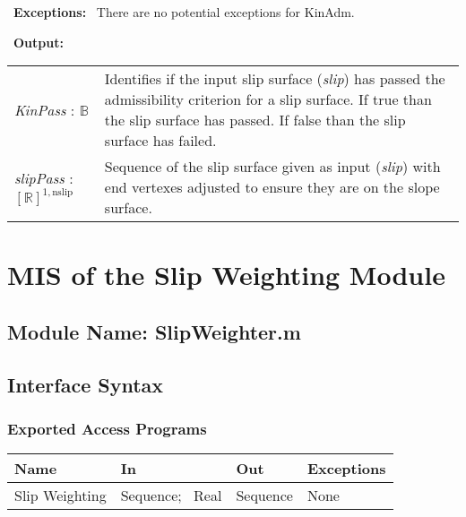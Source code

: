 \documentclass[12pt]{article}
\begin{document}
~\newline\noindent \textbf{Exceptions:} ~\newline\noindent There are
no potential exceptions for KinAdm.

~\newline\noindent \textbf{Output:}
\renewcommand{\arraystretch}{1.5}
\begin{longtable}{p{} p{}}
  \textit{KinPass} : $\mathbb{B}$ & Identifies if the input slip
  surface (\textit{slip}) has passed the admissibility criterion for a
  slip surface. If true than the slip surface has passed. If false
  than the slip surface has failed. \\

  \textit{slipPass} : $[\mathbb{R}]^{1,\text{nslip}}$ & Sequence of
  the slip surface given as input (\textit{slip}) with end vertexes
  adjusted to ensure they are on the slope surface.
\end{longtable}


\section{MIS of the Slip Weighting
  Module} \label{sec:WeightMod}

\subsection{Module Name: SlipWeighter.m}

\subsection{Interface Syntax}

\subsubsection{Exported Access Programs}
\begin{center}
\renewcommand*{\arraystretch}{1.5}
\begin{tabular}{| p{} | p{} | 
p{} | p{} |} \hline 

  \textbf{Name} & \textbf{In} & \textbf{Out} & \textbf{Exceptions}
  \\ \hline

  Slip Weighting & Sequence; ~\newline Real & Sequence & None
  \\ \hline
\end{tabular}
\end{center}
\end{document}
